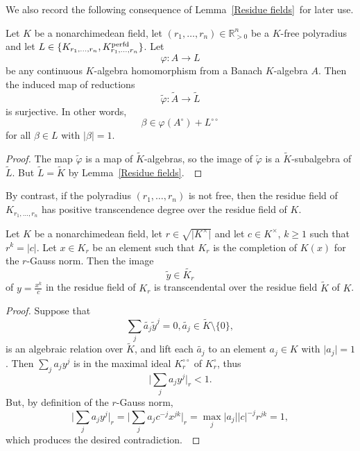 We also record the following consequence of Lemma~\ref{Residue fields} for later use. 
\begin{cor}\label{Reductions}Let $K$ be a nonarchimedean field, let $(r_1,\dots, r_n)\in \mathbb{R}_{>0}^{n}$ be a $K$-free polyradius and let $L\in \{K_{r_1,\dots, r_n}, K_{r_1,\dots, r_n}^{\operatorname{perfd}}\}$. Let \begin{equation*}\varphi: A\to L\end{equation*}be any continuous $K$-algebra homomorphism from a Banach $K$-algebra $A$. Then the induced map of reductions \begin{equation*}\widetilde{\varphi}: \widetilde{A}\to \widetilde{L}\end{equation*}is surjective. In other words, \begin{equation*}\beta\in \varphi(A^{\circ})+L^{\circ\circ}\end{equation*}for all $\beta\in L$ with $\vert \beta\vert=1$. \end{cor}
\begin{proof}The map $\widetilde{\varphi}$ is a map of $\widetilde{K}$-algebras, so the image of $\widetilde{\varphi}$ is a $\widetilde{K}$-subalgebra of $\widetilde{L}$. But $\widetilde{L}=\widetilde{K}$ by Lemma~\ref{Residue fields}. \end{proof}
By contrast, if the polyradius $(r_1,\dots, r_n)$ is not free, then the residue field of $K_{r_1,\dots, r_n}$ has positive transcendence degree over the residue field of $K$. \begin{lemma}\label{Rational}Let $K$ be a nonarchimedean field, let $r\in\sqrt{\vert K^{\times}\vert}$ and let $c\in K^{\times}$, $k\geq1$ such that $r^{k}=\vert c\vert$. Let $x\in K_{r}$ be an element such that $K_{r}$ is the completion of $K(x)$ for the $r$-Gauss norm. Then the image \begin{equation*}\widetilde{y}\in \widetilde{K_{r}}\end{equation*}of $y=\frac{x^{k}}{c}$ in the residue field of $K_{r}$ is transcendental over the residue field $\widetilde{K}$ of $K$. \end{lemma}
\begin{proof}Suppose that \begin{equation*}\sum_{j}\widetilde{a_{j}}\widetilde{y}^{j}=0, \widetilde{a_{j}}\in \widetilde{K}\setminus\{0\},\end{equation*}is an algebraic relation over $\widetilde{K}$, and lift each $\widetilde{a_{j}}$ to an element $a_{j}\in K$ with $\vert a_{j}\vert=1$. 
Then \(\sum_{j}^{} a_{j}y^{j} \) is in the maximal ideal \(K_{r}^{\circ\circ}\) of \(K_{r}^{\circ}\),
thus \begin{equation*}\vert \sum_{j}a_{j}y^{j}\vert_{r}<1.\end{equation*}But, by definition of the $r$-Gauss norm, \begin{equation*}\vert \sum_{j}a_{j}y^{j}\vert_{r}=\vert \sum_{j}a_{j}c^{-j}x^{jk}\vert_{r}=\max_{j}\vert a_{j}\vert \vert c\vert^{-j}r^{jk}=1,\end{equation*}which produces the desired contradiction. \end{proof}
